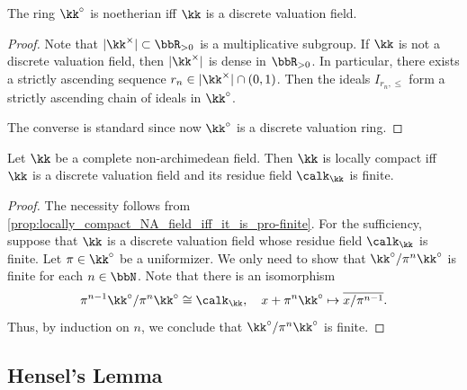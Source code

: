     \begin{proposition}\label{prop:integers_ring_of_NA_field_is_noetherian_iff_discrete_valuation}
        The ring \(\kk^\circ\) is noetherian iff \(\kk\) is a discrete valuation field.
    \end{proposition}
    \begin{proof}
        Note that \(|\kk^\times| \subset \bbR_{>0}\) is a multiplicative subgroup.
        If \(\kk\) is not a discrete valuation field, then \(|\kk^\times|\) is dense in \(\bbR_{>0}\).
        In particular, there exists a strictly ascending sequence \(r_n \in |\kk^\times| \cap (0,1)\).
        Then the ideals \(I_{r_n,\leq}\) form a strictly ascending chain of ideals in \(\kk^\circ\).

        The converse is standard since now \(\kk^\circ\) is a discrete valuation ring.
    \end{proof}

    \begin{proposition}\label{prop:locally_compact_NA_fields_iff_finite_residue_field_and_discrete_valuation}
        Let \(\kk\) be a complete non-archimedean field. 
        Then \(\kk\) is locally compact iff \(\kk\) is a discrete valuation field and its residue field \(\calk_\kk\) is finite.
    \end{proposition}
    \begin{proof}
        The necessity follows from \cref{prop:locally_compact_NA_field_iff_it_is_pro-finite}.
        For the sufficiency, suppose that \(\kk\) is a discrete valuation field whose residue field \(\calk_\kk\) is finite.
        Let \(\pi \in \kk^\circ\) be a uniformizer.
        We only need to show that \(\kk^\circ/ \pi^n \kk^\circ\) is finite for each \(n \in \bbN\).
        Note that there is an isomorphism
        \[ \pi^{n-1} \kk^\circ / \pi^n \kk^\circ \cong \calk_\kk, \quad x + \pi^n \kk^\circ \mapsto \overline{x/\pi^{n-1}}. \]
        Thus, by induction on \(n\), we conclude that \(\kk^\circ / \pi^n \kk^\circ\) is finite.
    \end{proof}



\subsection{Hensel's Lemma}

